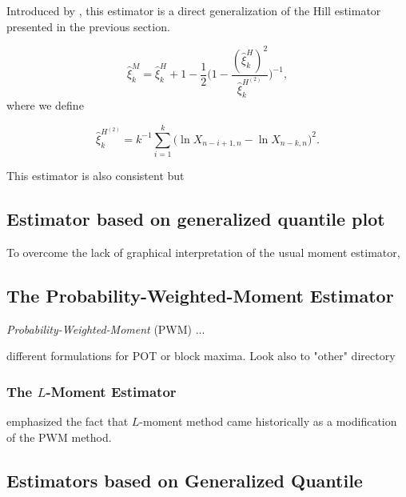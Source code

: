 \documentclass[11pt,a4paper,openany ]{book}
\begin{document}
Introduced by \cite{dekkers_moment_1989}, this estimator is a direct generalization of the Hill estimator presented in the previous section. 

\begin{equation}
\hat{\xi}^M_k=\hat{\xi}_k^H+1-\frac{1}{2}\Bigg(1-\frac{(\hat{\xi}_k^H)^2}{\hat{\xi}^{H^{(2)}}_k }\Bigg)^{-1},
\end{equation}
where we define 

\begin{equation*}
\hat{\xi}^{H^{(2)}}_k=k^{-1}\sum_{i=1}^k\big(\ln X_{n-i+1,n}-\ln X_{n-k,n}\big)^2.
\end{equation*}


This estimator is also consistent but  


\subsection*{Estimator based on generalized quantile plot}

To overcome the lack of graphical interpretation of the usual moment estimator, 




\subsection{The Probability-Weighted-Moment Estimator}

\emph{Probability-Weighted-Moment} (PWM)
...

different formulations for POT or block maxima. Look also to "other" directory
\cite{ribereau_skew_2016}


\subsubsection*{The $L$-Moment Estimator}
\cite{wang_lh_1997}

\cite{hosking_regional_1997} emphasized the fact that $L$-moment method came historically as a modification of the PWM method. 

\subsection{Estimators based on Generalized Quantile }
\end{document}
